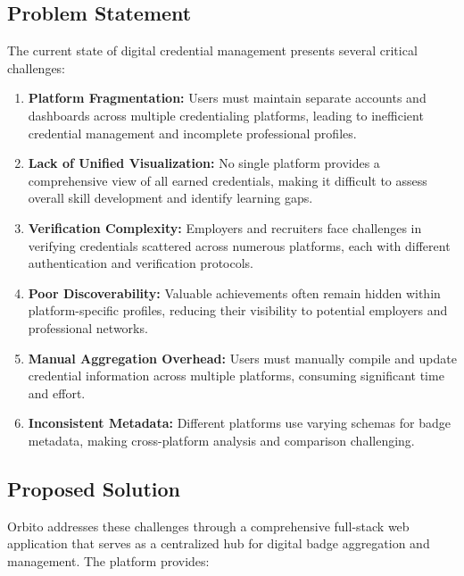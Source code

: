 \documentclass[12pt,a4paper]{article}
\begin{document}
\subsection{Problem Statement}
The current state of digital credential management presents several critical challenges:

\begin{enumerate}[leftmargin=*]
    \item \textbf{Platform Fragmentation:} Users must maintain separate accounts and dashboards across multiple credentialing platforms, leading to inefficient credential management and incomplete professional profiles.
    \item \textbf{Lack of Unified Visualization:} No single platform provides a comprehensive view of all earned credentials, making it difficult to assess overall skill development and identify learning gaps.
    \item \textbf{Verification Complexity:} Employers and recruiters face challenges in verifying credentials scattered across numerous platforms, each with different authentication and verification protocols.
    \item \textbf{Poor Discoverability:} Valuable achievements often remain hidden within platform-specific profiles, reducing their visibility to potential employers and professional networks.
    \item \textbf{Manual Aggregation Overhead:} Users must manually compile and update credential information across multiple platforms, consuming significant time and effort.
    \item \textbf{Inconsistent Metadata:} Different platforms use varying schemas for badge metadata, making cross-platform analysis and comparison challenging.
\end{enumerate}

\subsection{Proposed Solution}
Orbito addresses these challenges through a comprehensive full-stack web application that serves as a centralized hub for digital badge aggregation and management. The platform provides:
\end{document}
